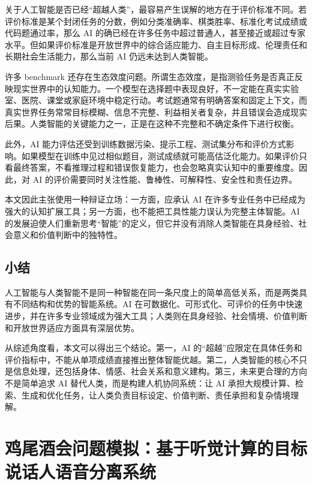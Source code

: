 \documentclass[UTF8,zihao=-4,a4paper]{ctexart}
\begin{document}
关于人工智能是否已经“超越人类”，最容易产生误解的地方在于评价标准不同。若评价标准是某个封闭任务的分数，例如分类准确率、棋类胜率、标准化考试成绩或代码题通过率，那么 AI 的确已经在许多任务中超过普通人，甚至接近或超过专家水平。但如果评价标准是开放世界中的综合适应能力、自主目标形成、伦理责任和长期社会生活能力，那么当前 AI 仍远未达到人类智能。

许多 benchmark 还存在生态效度问题。所谓生态效度，是指测验任务是否真正反映现实世界中的认知能力。一个模型在选择题中表现良好，不一定能在真实实验室、医院、课堂或家庭环境中稳定行动。考试题通常有明确答案和固定上下文，而真实世界任务常常目标模糊、信息不完整、利益相关者复杂，并且错误会造成现实后果。人类智能的关键能力之一，正是在这种不完整和不确定条件下进行权衡。

此外，AI 能力评估还受到训练数据污染、提示工程、测试集分布和评价方式影响。如果模型在训练中见过相似题目，测试成绩就可能高估泛化能力。如果评价只看最终答案，不看推理过程和错误恢复能力，也会忽略真实认知中的重要维度。因此，对 AI 的评价需要同时关注性能、鲁棒性、可解释性、安全性和责任边界。

本文因此主张使用一种辩证立场：一方面，应承认 AI 在许多专业任务中已经成为强大的认知扩展工具；另一方面，也不能把工具性能力误认为完整主体智能。AI 的发展迫使人们重新思考“智能”的定义，但它并没有消除人类智能在具身经验、社会意义和价值判断中的独特性。

\subsection{小结}

人工智能与人类智能不是同一种智能在同一条尺度上的简单高低关系，而是两类具有不同结构和优势的智能系统。AI 在可数据化、可形式化、可评价的任务中快速进步，并在许多专业领域成为强大工具；人类则在具身经验、社会情境、价值判断和开放世界适应方面具有深层优势。

从综述角度看，本文可以得出三个结论。第一，AI 的“超越”应限定在具体任务和评价指标中，不能从单项成绩直接推出整体智能优越。第二，人类智能的核心不只是信息处理，还包括身体、情感、社会关系和意义建构。第三，未来更合理的方向不是简单追求 AI 替代人类，而是构建人机协同系统：让 AI 承担大规模计算、检索、生成和优化任务，让人类负责目标设定、价值判断、责任承担和复杂情境理解。

\newpage

\section{鸡尾酒会问题模拟：基于听觉计算的目标说话人语音分离系统}
\end{document}
